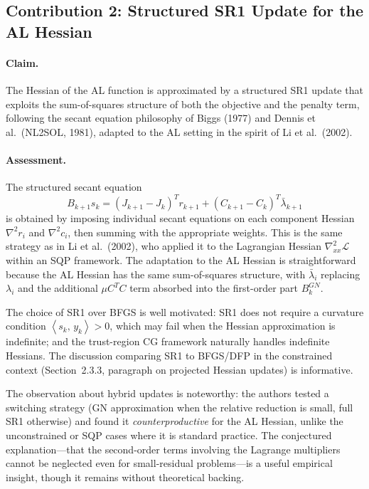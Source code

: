 \documentclass[11pt]{article}
\newcommand{\inner}[2]{\left\langle #1,\, #2 \right\rangle}
\theoremstyle{plain}
\begin{document}
\subsection{Contribution 2: Structured SR1 Update for the AL Hessian}

\paragraph{Claim.} The Hessian of the AL function is approximated by a structured SR1 update that exploits the sum-of-squares structure of both the objective and the penalty term, following the secant equation philosophy of Biggs (1977) and Dennis et al.\ (NL2SOL, 1981), adapted to the AL setting in the spirit of Li et al.\ (2002).

\paragraph{Assessment.} The structured secant equation
\[
B_{k+1}s_k = (J_{k+1} - J_k)^Tr_{k+1} + (C_{k+1} - C_k)^T\bar{\lambda}_{k+1}
\]
is obtained by imposing individual secant equations on each component Hessian $\nabla^2 r_i$ and $\nabla^2 c_i$, then summing with the appropriate weights. This is the same strategy as in Li et al.\ (2002), who applied it to the Lagrangian Hessian $\nabla^2_{xx}\mathcal{L}$ within an SQP framework. The adaptation to the AL Hessian is straightforward because the AL Hessian has the same sum-of-squares structure, with $\bar{\lambda}_i$ replacing $\lambda_i$ and the additional $\mu C^TC$ term absorbed into the first-order part $B_k^{GN}$.

The choice of SR1 over BFGS is well motivated: SR1 does not require a curvature condition $\inner{s_k}{y_k} > 0$, which may fail when the Hessian approximation is indefinite; and the trust-region CG framework naturally handles indefinite Hessians. The discussion comparing SR1 to BFGS/DFP in the constrained context (Section~2.3.3, paragraph on projected Hessian updates) is informative.

The observation about hybrid updates is noteworthy: the authors tested a switching strategy (GN approximation when the relative reduction is small, full SR1 otherwise) and found it \emph{counterproductive} for the AL Hessian, unlike the unconstrained or SQP cases where it is standard practice. The conjectured explanation---that the second-order terms involving the Lagrange multipliers cannot be neglected even for small-residual problems---is a useful empirical insight, though it remains without theoretical backing.
\end{document}
